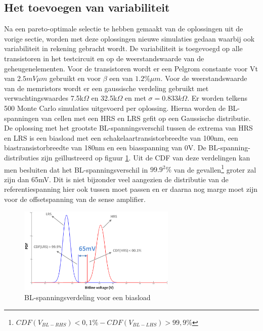 \subsection{Het toevoegen van variabiliteit}\label{sec:varload}
Na een pareto-optimale selectie te hebben gemaakt van de oplossingen uit de vorige sectie, worden met deze oplossingen nieuwe simulaties gedaan waarbij ook variabiliteit in rekening gebracht wordt. De variabiliteit is toegevoegd op alle transistoren in het testcircuit en op de weerstandswaarde van de geheugenelementen. Voor de transistoren wordt er een Pelgrom constante voor Vt van $2.5mV\mu m$ gebruikt en voor $\beta$ een van $1.2\% \mu m$\cite{ppt:variatie}. Voor de weerstandswaarde van de memristors wordt er een gaussische verdeling gebruikt met verwachtingswaardes 7.5k$\Omega$ en 32.5k$\Omega$ en met $\sigma = 0.833k\Omega$. Er worden telkens 500 Monte Carlo simulaties uitgevoerd per oplossing. Hierna worden de BL-spanningen van cellen met een HRS en LRS gefit op een Gaussische distributie. De oplossing met het grootste BL-spanningsverschil tussen de extrema van HRS en LRS is een biasload met een schakelaartransistorbreedte van 100nm, een biastransistorbreedte van 180nm en een biasspanning van 0V. De BL-spanning-distributies zijn geïllustreerd op figuur \ref{fig:distbias}. Uit de CDF van deze verdelingen kan men besluiten dat het BL-spanningsverschil in $99.9^2\%$ van de gevallen\footnote{$CDF(V_{BL-RHS})<0,1\%-CDF(V_{BL-LHS})>99,9\%$} groter zal zijn dan 65mV. Dit is niet bijzonder veel aangezien de distributie van de referentiespanning hier ook tussen moet passen en er daarna nog marge moet zijn voor de offsetspanning van de sense amplifier. 

\begin{figure}[!ht]
  \centering
  \includegraphics[width=0.67\textwidth]{../fig/hfdst-last-var1.png}
  \caption[BL-spanningsverdeling voor een biasload]{BL-spanningsverdeling voor een biasload}
  \label{fig:distbias}
\end{figure}

